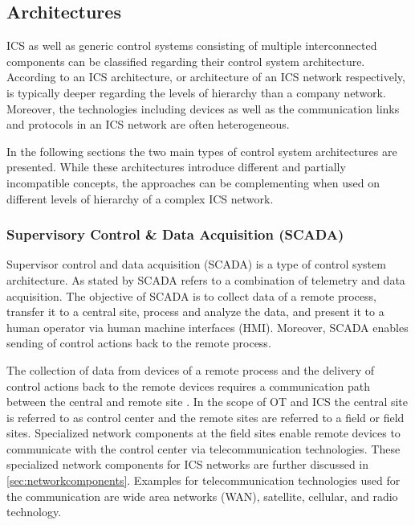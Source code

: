 \subsection{Architectures}
ICS as well as generic control systems consisting of multiple interconnected components can be classified regarding their control system architecture.
According to \citeauthor{Galloway2013} \cite{Galloway2013} an ICS architecture, or architecture of an ICS network respectively, is typically deeper regarding the levels of hierarchy than a company network.
Moreover, the technologies including devices as well as the communication links and protocols in an ICS network are often heterogeneous.

In the following sections the two main types of control system architectures are presented.
While these architectures introduce different and partially incompatible concepts, the approaches can be complementing when used on different levels of hierarchy of a complex ICS network.

\subsubsection{Supervisory Control \& Data Acquisition (SCADA)}
Supervisor control and data acquisition (SCADA) is a type of control system architecture.
As stated by \citeauthor{bailey2003} \cite{bailey2003} SCADA refers to a combination of telemetry and data acquisition.
The objective of SCADA is to collect data of a remote process, transfer it to a central site, process and analyze the data, and present it to a human operator via human machine interfaces (HMI).
Moreover, SCADA enables sending of control actions back to the remote process.

The collection of data from devices of a remote process and the delivery of control actions back to the remote devices requires a communication path between the central and remote site \cite{Stouffer2023}.
In the scope of OT and ICS the central site is referred to as control center and the remote sites are referred to a field or field sites.
Specialized network components at the field sites enable remote devices to communicate with the control center via telecommunication technologies.
These specialized network components for ICS networks are further discussed in \autoref{sec:networkcomponents}.
Examples for telecommunication technologies used for the communication are wide area networks (WAN), satellite, cellular, and radio technology.

